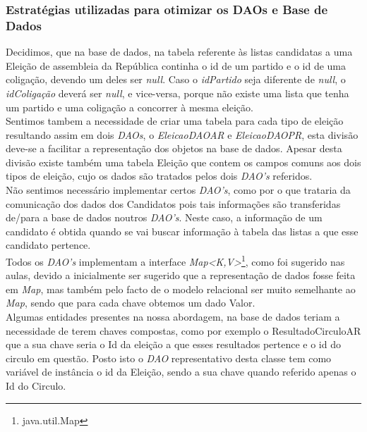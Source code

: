 \documentclass[a4paper,12pt]{report}
\begin{document}
\subsubsection{Estratégias utilizadas para otimizar os DAOs e Base de Dados}
Decidimos, que na base de dados, na tabela referente às listas candidatas a uma Eleição de assembleia da República continha o id de um partido e o id de uma coligação, devendo um deles ser \emph{null}. Caso o \emph{idPartido} seja diferente de \emph{null}, o \emph{idColigação} deverá ser \emph{null}, e vice-versa, porque não existe uma lista que tenha um partido e uma coligação a concorrer à mesma eleição.
\\\indent Sentimos tambem a necessidade de criar uma tabela para cada tipo de eleição resultando assim em dois \emph{DAOs}, o  \emph{EleicaoDAOAR} e \emph{EleicaoDAOPR}, esta divisão deve-se a facilitar a representação dos objetos na base de dados. Apesar desta divisão existe também uma tabela Eleição que contem os campos comuns aos dois tipos de eleição, cujo os dados são tratados pelos dois \emph{DAO's} referidos. 
\\\indent Não sentimos necessário implementar certos \emph{DAO's}, como por o que trataria da comunicação dos dados dos Candidatos pois tais informações são transferidas de/para a base de dados
noutros \emph{DAO's}. Neste caso, a informação de um candidato é obtida quando se vai buscar 
informação à tabela das listas a que esse candidato pertence.
\\\indent Todos os \emph{DAO's} implementam a interface \emph{Map<K,V>}\footnote{java.util.Map}, como foi sugerido nas aulas, devido a inicialmente ser sugerido que a representação de dados fosse feita em \emph{Map}, mas também pelo facto de o modelo relacional ser muito semelhante ao \emph{Map}, sendo que para cada chave obtemos um dado Valor.
\\\indent Algumas entidades presentes na nossa abordagem, na base de dados teriam a necessidade de terem chaves compostas, como por exemplo o ResultadoCirculoAR que a sua chave seria o Id da eleição a que esses resultados pertence e o id do circulo em questão. Posto isto o \emph{DAO} representativo desta classe tem como variável de instância o id da Eleição, sendo a sua chave quando referido apenas o Id do Circulo. 
\end{document}

